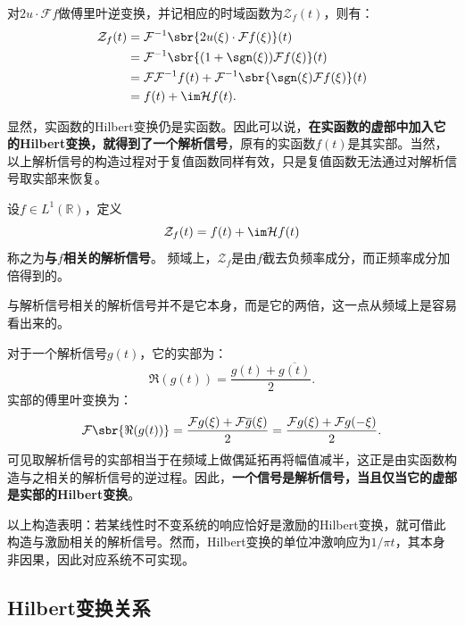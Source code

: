 对$2u\cdot\mathcal{F}f$做傅里叶逆变换，并记相应的时域函数为$\mathcal{Z}_f(t)$，则有：
\begin{align}
    \mathcal{Z}_f(t)&=\mathcal{F}^{-1}\sbr{2u(\xi)\cdot\mathcal{F}f(\xi)}(t)\nonumber\\
    &=\mathcal{F}^{-1}\sbr{(1+\sgn(\xi))\mathcal{F}f(\xi)}(t)\nonumber\\
    &=\mathcal{F}\mathcal{F}^{-1}f(t)+\mathcal{F}^{-1}\sbr{\sgn(\xi)\mathcal{F}f(\xi)}(t)\nonumber\\
    &=f(t)+\im\mathcal{H}f(t).
\end{align}

显然，实函数的Hilbert变换仍是实函数。因此可以说，\textbf{在实函数的虚部中加入它的Hilbert变换，就得到了一个解析信号}，原有的实函数$f(t)$是其实部。当然，以上解析信号的构造过程对于复值函数同样有效，只是复值函数无法通过对解析信号取实部来恢复。

\begin{definition}
    设$f\in L^1(\mathbb{R})$，定义
    \begin{equation}
        \mathcal{Z}_f(t)=f(t)+\im\mathcal{H}f(t)
    \end{equation}
    称之为\textbf{与}$f$\textbf{相关的解析信号}。
    频域上，$\mathcal{Z}_f$是由$f$截去负频率成分，而正频率成分加倍得到的。
\end{definition}

与解析信号相关的解析信号并不是它本身，而是它的两倍，这一点从频域上是容易看出来的。

对于一个解析信号$g(t)$，它的实部为：
\begin{equation}
    \Re(g(t))=\frac{g(t)+\overline{g(t)}}{2}.
\end{equation}
实部的傅里叶变换为：
\begin{equation}
    \mathcal{F}\sbr{\Re(g(t))}=\frac{\mathcal{F}g(\xi)+\mathcal{F}\overline{g}(\xi)}{2}=\frac{\mathcal{F}g(\xi)+\mathcal{F}g(-\xi)}{2}.
\end{equation}
可见取解析信号的实部相当于在频域上做偶延拓再将幅值减半，这正是由实函数构造与之相关的解析信号的逆过程。因此，\textbf{一个信号是解析信号，当且仅当它的虚部是实部的Hilbert变换}。

以上构造表明：若某线性时不变系统的响应恰好是激励的Hilbert变换，就可借此构造与激励相关的解析信号。然而，Hilbert变换的单位冲激响应为$1/\pi t$，其本身非因果，因此对应系统不可实现。

\subsection{Hilbert变换关系}\label{sub:hilbert_relation}

